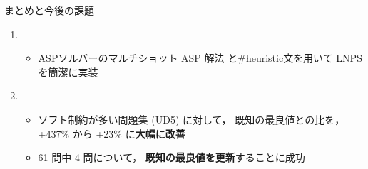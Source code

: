\documentclass[11pt,dvipdfmx]{beamer}
\begin{document}
\begin{frame}{まとめと今後の課題}
  \begin{enumerate}
  \item {}
    \begin{itemize}
    \item ASPソルバー{\clingo}のマルチショット ASP 解法
      と\textsf{\#heuristic}文を用いて LNPS を簡潔に実装
    \end{itemize}
  \item {}
    \begin{itemize}
      \item ソフト制約が多い問題集 (UD5) に対して，
        既知の最良値との比を，+437\% から +23\% に\alert{\bf 大幅に改善}
      \item 61 問中 4 問について，
        \alert{\bf 既知の最良値を更新}することに成功
    \end{itemize}
  \end{enumerate}


\end{frame}
\end{document}
